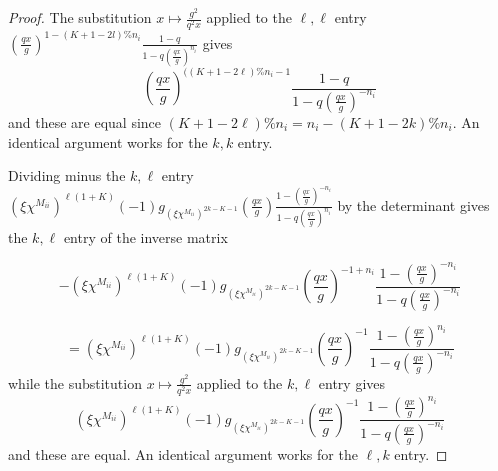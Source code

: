 \documentclass[11pt,letterpaper]{article}
\theoremstyle{definition}
\theoremstyle{remark}
\numberwithin{equation}{section}
\theoremstyle{dotless}
\begin{document}
\begin{proof}
The substitution $x \mapsto \frac{ g^2}{q^2x}$ applied to the $\ell,\ell$ entry  $ \left(\frac{qx}{g}\right)^{1 - (K +1-2l)\% n_i} \frac{1-q}{1-q\left(\frac{q x}{g}\right)^{n_i}}$ gives $$ \left(\frac{qx}{g}\right)^{((K+1-2\ell)\%n_i -1 } \frac{1-q}{1-q\left(\frac{q x}{g}\right)^{-n_i}}$$ and these are equal since $(K+1-2\ell)\%n_i  = n_i - (K +1-2k)\%n_i$. An identical argument works for the $k,k$ entry.

Dividing minus the $k,\ell$ entry $(\xi \chi^{M_{ii}})^{\ell (1+K)}(-1) g_{(\xi \chi^{M_{ii}})^{2k-K -1}}\left(\frac{qx}{g}\right) \frac{1-\left(\frac{qx}{g}\right)^{-n_i}}{1-q\left(\frac{qx}{g}\right)^{n_i}} $ by the determinant gives the $k,\ell$ entry of the inverse matrix

$$ - (\xi \chi^{M_{ii}})^{\ell (1+K)}(-1) g_{(\xi \chi^{M_{ii}})^{2k-K -1}} \left(\frac{qx}{g}\right)^{-1 +n_i}  \frac{1-\left(\frac{qx}{g}\right)^{-n_i}}{1-q\left(\frac{qx}{g}\right)^{-n_i}} $$

$$ =  (\xi \chi^{M_{ii}})^{\ell (1+K)}(-1) g_{(\xi \chi^{M_{ii}})^{2k-K -1}} \left(\frac{qx}{g}\right)^{-1 }  \frac{1-\left(\frac{qx}{g}\right)^{n_i}}{1-q\left(\frac{qx}{g}\right)^{-n_i}}$$
while the substitution $x \mapsto \frac{ g^2}{q^2x}$ applied to the $k,\ell$ entry gives
$$(\xi \chi^{M_{ii}})^{\ell (1+K)}(-1) g_{(\xi \chi^{M_{ii}})^{2k-K -1}} \left(\frac{qx}{g}\right)^{-1} \frac{1-\left(\frac{qx}{g}\right)^{n_i}}{1-q\left(\frac{qx}{g}\right)^{-n_i}} $$ and these are equal. An identical argument works for the $\ell,k$ entry. \end{proof}

\end{document}
